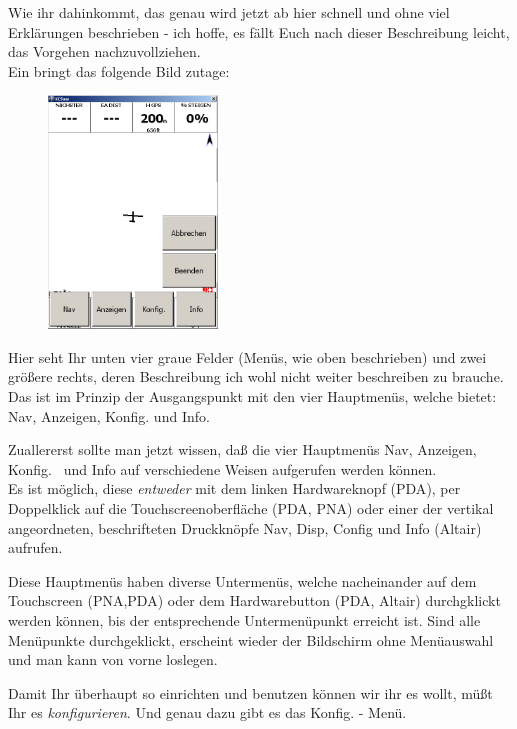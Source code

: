 Wie ihr dahinkommt, das genau wird jetzt ab hier schnell und ohne viel Erklärungen beschrieben  - ich hoffe, es fällt Euch nach dieser Beschreibung leicht, das Vorgehen nachzuvollziehen.\\

Ein \dklick bringt das folgende Bild zutage:

\begin{figure}
\includegraphics[width=4.5cm]{Bilder/verysecond.png}
\end{figure}

Hier seht Ihr unten vier graue Felder (Menüs, wie  oben beschrieben) und zwei größere rechts, deren Beschreibung ich  wohl nicht weiter beschreiben zu brauche. Das ist im Prinzip der Ausgangspunkt mit den vier Hauptmenüs, welche \xc bietet: \textsf{Nav}, \textsf{Anzeigen},\textsf{ Konfig.} und \textsf{Info}.

Zuallererst sollte man jetzt wissen, daß die vier Hauptmenüs \textsf{Nav}, \textsf{Anzeigen}, \textsf{Konfig.\ } und \textsf{Info} auf verschiedene Weisen aufgerufen werden können.\\

Es ist möglich, diese  \textsl{entweder }mit dem linken Hardwareknopf (\textsf{PDA}), per Doppelklick auf die Touchscreenoberfläche (\textsf{\textsf{PDA, PNA}}) oder einer der vertikal angeordneten, beschrifteten Druckknöpfe \textsf{Nav}, \textsf{Disp}, \textsf{Config} und \textsf{Info} (\textsf{Altair}) aufrufen.

Diese Hauptmenüs haben diverse Untermenüs, welche nacheinander auf dem Touchscreen
(\textsf{PNA,PDA}) oder dem Hardwarebutton (\textsf{PDA, Altair}) durchgklickt werden
können, bis der entsprechende Untermenüpunkt erreicht ist. Sind alle Menüpunkte
durchgeklickt, erscheint wieder der Bildschirm ohne Menüauswahl und man kann von
vorne loslegen.

Damit Ihr  \xc  überhaupt so einrichten und benutzen können wir ihr es wollt, müßt Ihr es \textsl{konfigurieren}. Und genau dazu gibt es das \textsf{Konfig.} - Menü.\\[1em]

